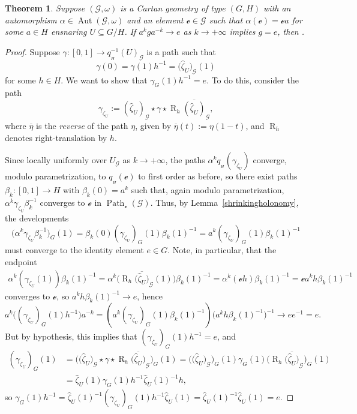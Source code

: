 \documentclass[10pt,a4paper]{amsart}
\numberwithin{equation}{section}
\newtheorem{Theorem}{Theorem}[section]
\theoremstyle{definition}
\DeclareMathOperator{\Hol}{\mathrm{Hol}}
\DeclareMathOperator{\Aut}{\mathrm{Aut}}
\DeclareMathOperator{\Path}{Path}
\newcommand{\Rt}[1]{\operatorname{R}_{#1}}
\begin{document}
\begin{Theorem}\label{ensnaringthm} Suppose $(\mathscr{G},\omega)$ is a Cartan geometry of type $(G,H)$ with an automorphism $\alpha\in\Aut(\mathscr{G},\omega)$ and an element $\mathscr{e}\in\mathscr{G}$ such that $\alpha(\mathscr{e})=\mathscr{e}a$ for some $a\in H$ ensnaring $U\subseteq G/H$. If $a^kga^{-k}\rightarrow e$ as $k\rightarrow+\infty$ implies $g=e$, then \smash{$\Hol_{(\hat{\zeta}_U)_\mathscr{G}(1)}\bigl(q_{{}_H}^{-1}(U)_\mathscr{G},\omega\bigr)=\{e\}$}.\end{Theorem}
\begin{proof}Suppose $\gamma \colon [0,1]\to q_{{}_H}^{-1}(U)_\mathscr{G}$ is a path such that \[\gamma(0)=\gamma(1)h^{-1}=\bigl(\hat{\zeta}_U\bigr)_\mathscr{G}(1)\] for some $h\in H$. We want to show that $\gamma_G(1)h^{-1}=e$. To do this, consider the path \[\gamma_{\zeta_U}:=(\hat{\zeta}_U)_\mathscr{G}\star\gamma\star\Rt{h}\overline{(\hat{\zeta}_U)}_\mathscr{G},\] where $\overline{\eta}$ is the \emph{reverse} of the path $\eta$, given by $\overline{\eta}(t):=\eta(1-t)$, and $\Rt{h}$ denotes right-translation by $h$.

Since  locally uniformly over $U_\mathscr{G}$ as $k\rightarrow +\infty$, the paths $\alpha^k q_{{}_H}(\gamma_{\zeta_U})$ converge, modulo parametrization, to $q_{{}_H}(\mathscr{e})$ to first order as before, so there exist paths $\beta_k\colon [0,1]\to H$ with $\beta_k(0)=a^k$ such that, again modulo parametrization, $\alpha^k\gamma_{\zeta_U}\beta_k^{-1}$ converges to $\mathscr{e}$ in $\Path_\mathscr{e}(\mathscr{G})$. Thus, by Lemma~\ref{shrinkingholonomy}, the developments
\[\bigl(\alpha^k\gamma_{\zeta_U}\beta_k^{-1}\bigr)_G(1) =\beta_k(0)(\gamma_{\zeta_U})_G(1)\beta_k(1)^{-1}=a^k(\gamma_{\zeta_U})_G(1)\beta_k(1)^{-1}\]
must converge to the identity element $e\in G$. Note, in particular, that the endpoint
\begin{align*}\alpha^k(\gamma_{\zeta_U}(1))\beta_k(1)^{-1}   =\alpha^k\bigl(\Rt{h}\overline{\bigl(\hat{\zeta}_U\bigr)}_\mathscr{G}(1)\bigr)\beta_k(1)^{-1}  =\alpha^k(\mathscr{e}h)\beta_k(1)^{-1}=\mathscr{e}a^kh\beta_k(1)^{-1}
\end{align*}
converges to $\mathscr{e}$, so $a^kh\beta_k(1)^{-1}\rightarrow e$, hence
\[a^k\bigl((\gamma_{\zeta_U})_G(1)h^{-1}\bigr)a^{-k} =(a^k(\gamma_{\zeta_U})_G(1)\beta_k(1)^{-1})\bigl(a^kh\beta_k(1)^{-1}\bigr)^{-1}\rightarrow ee^{-1}=e.\]
But by hypothesis, this implies that $(\gamma_{\zeta_U})_G(1)h^{-1}=e$, and
\begin{align*}(\gamma_{\zeta_U})_G(1) & =\bigl(\bigl(\hat{\zeta}_U\bigr)_\mathscr{G}\star\gamma\star\Rt{h}\overline{\bigl(\hat{\zeta}_U\bigr)}_\mathscr{G}\bigr)_G (1) =\bigl(\bigl(\hat{\zeta}_U\bigr)_\mathscr{G}\bigr)_G\!(1) \gamma_G(1)\bigl(\Rt{h}\overline{\bigl(\hat{\zeta}_U\bigr)}_\mathscr{G}\bigr)_G (1)
\\ & =\hat{\zeta}_U(1)\gamma_G(1)h^{-1}\hat{\zeta}_U(1)^{-1}h,
\end{align*} so $\gamma_G(1)h^{-1}=\hat{\zeta}_U(1)^{-1}(\gamma_{\zeta_U})_G(1)h^{-1}\hat{\zeta}_U(1)=\hat{\zeta}_U(1)^{-1}\hat{\zeta}_U(1)=e$.
\end{proof}
\end{document}
